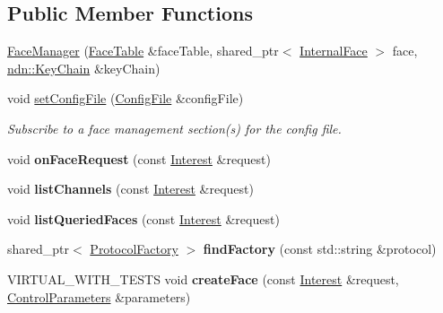 \subsection*{Public Member Functions}
\begin{DoxyCompactItemize}
\item 
\hyperlink{classnfd_1_1FaceManager_a1904b38efcb8254550e015d854efc79b}{Face\+Manager} (\hyperlink{classnfd_1_1FaceTable}{Face\+Table} \&face\+Table, shared\+\_\+ptr$<$ \hyperlink{classnfd_1_1InternalFace}{Internal\+Face} $>$ face, \hyperlink{classndn_1_1security_1_1KeyChain}{ndn\+::\+Key\+Chain} \&key\+Chain)
\item 
void \hyperlink{classnfd_1_1FaceManager_aaee8f3f47b19a43b1f54c42e797b0389}{set\+Config\+File} (\hyperlink{classnfd_1_1ConfigFile}{Config\+File} \&config\+File)\hypertarget{classnfd_1_1FaceManager_aaee8f3f47b19a43b1f54c42e797b0389}{}\label{classnfd_1_1FaceManager_aaee8f3f47b19a43b1f54c42e797b0389}

\begin{DoxyCompactList}\small\item\em Subscribe to a face management section(s) for the config file. \end{DoxyCompactList}\item 
void {\bfseries on\+Face\+Request} (const \hyperlink{classndn_1_1Interest}{Interest} \&request)\hypertarget{classnfd_1_1FaceManager_a4d527c24b6e698c9eafa7950d5892497}{}\label{classnfd_1_1FaceManager_a4d527c24b6e698c9eafa7950d5892497}

\item 
void {\bfseries list\+Channels} (const \hyperlink{classndn_1_1Interest}{Interest} \&request)\hypertarget{classnfd_1_1FaceManager_a7cf079f19bfba7c1885c7bfee4fc9a5c}{}\label{classnfd_1_1FaceManager_a7cf079f19bfba7c1885c7bfee4fc9a5c}

\item 
void {\bfseries list\+Queried\+Faces} (const \hyperlink{classndn_1_1Interest}{Interest} \&request)\hypertarget{classnfd_1_1FaceManager_aa1b47753caca5a42e10c5f72c98928a6}{}\label{classnfd_1_1FaceManager_aa1b47753caca5a42e10c5f72c98928a6}

\item 
shared\+\_\+ptr$<$ \hyperlink{classnfd_1_1ProtocolFactory}{Protocol\+Factory} $>$ {\bfseries find\+Factory} (const std\+::string \&protocol)\hypertarget{classnfd_1_1FaceManager_ad938dd47024442e8b7aa5768e4e071a5}{}\label{classnfd_1_1FaceManager_ad938dd47024442e8b7aa5768e4e071a5}

\item 
V\+I\+R\+T\+U\+A\+L\+\_\+\+W\+I\+T\+H\+\_\+\+T\+E\+S\+TS void {\bfseries create\+Face} (const \hyperlink{classndn_1_1Interest}{Interest} \&request, \hyperlink{classndn_1_1nfd_1_1ControlParameters}{Control\+Parameters} \&parameters)\hypertarget{classnfd_1_1FaceManager_a9ec44e15ad75edde20c6bc3ec0c26b8b}{}\label{classnfd_1_1FaceManager_a9ec44e15ad75edde20c6bc3ec0c26b8b}


\end{DoxyCompactItemize}

